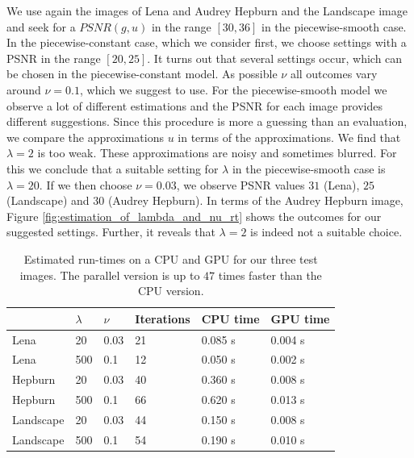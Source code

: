 \documentclass[abstracton]{scrreprt}
\begin{document}
            We use again the images of Lena and Audrey Hepburn and the Landscape image and seek for a $PSNR(g, u)$ in the range $[30, 36]$ in the piecewise-smooth case. In the piecewise-constant case, which we consider first, we choose settings with a PSNR in the range $[20, 25]$. It turns out that several settings occur, which can be chosen in the piecewise-constant model. As possible $\nu$ all outcomes vary around $\nu = 0.1$, which we suggest to use. For the piecewise-smooth model we observe a lot of different estimations and the PSNR for each image provides different suggestions. Since this procedure is more a guessing than an evaluation, we compare the approximations $u$ in terms of the approximations. We find that $\lambda = 2$ is too weak. These approximations are noisy and sometimes blurred. For this we conclude that a suitable setting for $\lambda$ in the piecewise-smooth case is $\lambda = 20$. If we then choose $\nu = 0.03$, we observe PSNR values $31$ (Lena), $25$ (Landscape) and $30$ (Audrey Hepburn). In terms of the Audrey Hepburn image, Figure \ref{fig:estimation_of_lambda_and_nu_rt} shows the outcomes for our suggested settings. Further, it reveals that $\lambda = 2$ is indeed not a suitable choice.\\
            \begin{table}[!ht]
                \parbox{.9\linewidth}{
                \centering
                    \begin{tabular}{| l || l | l | l | l | l |}
                        \hline
                         & $\lambda$ & $\nu$ & Iterations & CPU time & GPU time \\ \hline
                        Lena        & 20  & 0.03 & 21 & 0.085 s & 0.004 s \\ \hline
                        Lena        & 500 & 0.1  & 12 & 0.050 s & 0.002 s \\ \hline
                        Hepburn     & 20  & 0.03 & 40 & 0.360 s & 0.008 s \\ \hline
                        Hepburn     & 500 & 0.1  & 66 & 0.620 s & 0.013 s \\ \hline
                        Landscape   & 20  & 0.03 & 44 & 0.150 s & 0.008 s \\ \hline
                        Landscape   & 500 & 0.1  & 54 & 0.190 s & 0.010 s \\ \hline
                    \end{tabular}
                }
                \caption[Run-Times for best parameters real-time framework.]{Estimated run-times on a CPU and GPU for our three test images. The parallel version is up to $47$ times faster than the CPU version.}
                \label{tab:realtime_cpu_vs_gpu}
            \end{table}
            
\end{document}
